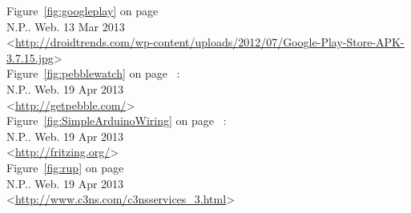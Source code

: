 	Figure~\ref{fig:googleplay} on page~\pageref{fig:googleplay} \\
	N.P.. Web. 13 Mar 2013\\
	<\url{http://droidtrends.com/wp-content/uploads/2012/07/Google-Play-Store-APK-3.7.15.jpg}> \\

	Figure~\ref{fig:pebblewatch} on page~\pageref{fig:pebblewatch} : \\
	N.P.. Web. 19 Apr 2013\\
	<\url{http://getpebble.com/}> \\

	Figure~\ref{fig:SimpleArduinoWiring} on page~\pageref{fig:SimpleArduinoWiring} : \\
	N.P.. Web. 19 Apr 2013\\
	<\url{http://fritzing.org/}> \\

	Figure~\ref{fig:rup} on page~\pageref{fig:rup} \\
	N.P.. Web. 19 Apr 2013\\
	<\url{http://www.c3ns.com/c3nsservices_3.html}> \\

